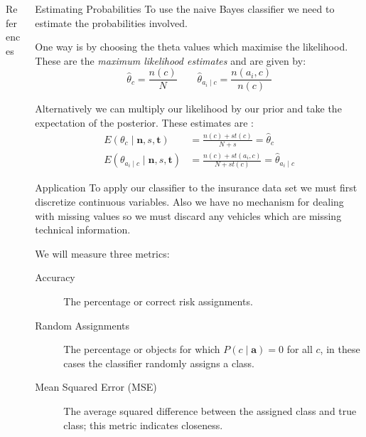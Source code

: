\documentclass{beamer}
\newcommand{\defn}[1]{\textit{\color{ETH10}#1}}
\begin{document}
\begin{frame}
\begin{columns}
\begin{column}{0.30\paperwidth}
		\begin{block}{\small References}
			{\footnotesize
			{}}
			
		\end{block}
		
	\end{column}

	\begin{column}{0.30\paperwidth}

		\begin{block}{Estimating Probabilities}
			To use the naive Bayes classifier we need to estimate the probabilities involved.\vspace{0.5em}

			One way is by choosing the theta values which maximise the likelihood. These are the \defn{maximum likelihood estimates} and are given by:
			\begin{equation}\label{mles}
				\hat{\theta}_c = \frac{n(c)}{N} \qquad
				\hat{\theta}_{a_i \mid c} = \frac{n(a_i, c)}{n(c)}
			\end{equation}\vspace{0.5em}

			Alternatively we can multiply our likelihood by our prior and take the expectation of the posterior. These estimates are \cite{Zaffalon01}:
			\begin{align}
				E(\theta_c \mid \mathbf{n},s,\mathbf{t}) & = \frac{n(c) + st(c)}{N + s} = \hat{\theta}_c \\
				E(\theta_{a_i \mid c} \mid \mathbf{n},s,\mathbf{t}) & = \frac{n(c) + st(a_i, c)}{N + st(c)} = \hat{\theta}_{a_i \mid c}
			\end{align}
		\end{block}

		\begin{block}{Application}
			To apply our classifier to the insurance data set we must first discretize continuous variables. Also we have no mechanism for dealing with missing values so we must discard any vehicles which are missing technical information.\vspace{0.5em}

			We will measure three metrics:
			\begin{description}
				\item[Accuracy] The percentage or correct risk assignments.
				\item[Random Assignments] The percentage or objects for which $P(c \mid \mathbf{a}) = 0$ for all $c$, in these cases the classifier randomly assigns a class.
				\item[Mean Squared Error (MSE)] The average squared difference between the assigned class and true class; this metric indicates closeness.
			\end{description}\vspace{0.5em}
		\end{block}


\end{column}
\end{columns}
\end{frame}
\end{document}
